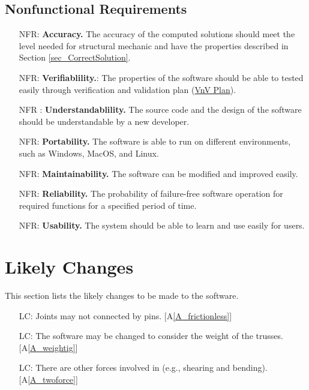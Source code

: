 \documentclass[12pt]{article}
\newcommand{\aref}[1]{A\ref{#1}}
\newcounter{reqnum} %
\newcounter{nonreqnum} %
\newcounter{lcnum} %
\begin{document}
\subsection{Nonfunctional Requirements}

\noindent 

\begin{itemize}
\item [NFR\refstepcounter{nonreqnum}\thenonreqnum \label{NFR_Accuracy}:] 
\textbf{Accuracy.} The accuracy of the computed solutions should meet the level 
needed 
for structural mechanic and have the properties described in Section 
\ref{sec_CorrectSolution}.
\item [NFR\refstepcounter{nonreqnum}\thenonreqnum \label{NFR_Verifiability}:]
\textbf{Verifiablility.}: The properties of the software should be able to 
tested easily through verification and validation plan 
(\href{https://github.com/tingyuw/cas741/blob/master/docs/VnVPlan/VnVPlan.pdf}{VnV
 Plan}). 
\item [NFR\refstepcounter{nonreqnum}\thenonreqnum 
\label{NFR_Understandability}:]
\textbf{Understandablility.} The source code and the design of the software 
should be understandable by a new developer.
\item [NFR\refstepcounter{nonreqnum}\thenonreqnum \label{NFR_Portability}:] 
\textbf{Portability.} The software is able to run on different environments, 
such as Windows, MacOS, and Linux.
\item [NFR\refstepcounter{nonreqnum}\thenonreqnum \label{NFR_Maintainability}:]
\textbf{Maintainability.} The software can be modified and improved easily.
\item [NFR\refstepcounter{nonreqnum}\thenonreqnum \label{NFR_Reliability}:]  
\textbf{Reliability.} The probability of failure-free software operation 
for required functions for a specified period of time.
\item [NFR\refstepcounter{nonreqnum}\thenonreqnum \label{NFR_Usability}:] 
\textbf{Usability.} The system should be able to learn and use easily for 
users. 

\end{itemize}

\section{Likely Changes}    
This section lists the likely changes to be made to the software.
\noindent \begin{itemize}

\item[LC\refstepcounter{lcnum}\thelcnum\label{LC_notpinconnect}:] Joints may 
not connected by pins. [\aref{A_frictionless}]

\item[LC\refstepcounter{lcnum}\thelcnum\label{LC_weightinclude}:] The 
software may be changed to consider the weight of the trusses.
[\aref{A_weightig}]

\item[LC\refstepcounter{lcnum}\thelcnum\label{LC_otherforce}:] There are other 
forces involved in (e.g., shearing and bending). [\aref{A_twoforce}]

\end{itemize}
\end{document}
